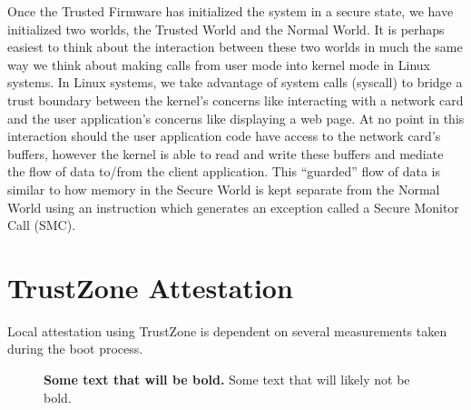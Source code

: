 Once the Trusted Firmware has initialized the system in a secure state, we have initialized two worlds, the Trusted World and the Normal World. It is perhaps easiest to think about the interaction between these two worlds in much the same way we think about making calls from user mode into kernel mode in Linux systems. In Linux systems, we take advantage of system calls (syscall) to bridge a trust boundary between the kernel's concerns like interacting with a network card and the user application's concerns like displaying a web page. At no point in this interaction should the user application code have access to the network card's buffers, however the kernel is able to read and write these buffers and mediate the flow of data to/from the client application. This ``guarded'' flow of data is similar to how memory in the Secure World is kept separate from the Normal World using an instruction which generates an exception called a Secure Monitor Call (SMC).

\section{TrustZone Attestation}

Local \gls{attestation} using TrustZone is dependent on several \glspl{measurement} taken during the boot process.

\begin{figure}[ht]
\centering

\caption[TruzeZone Attestation]{\textbf{Some text that will be bold.} Some text that will likely not be bold.}
\label{fig:tz-measure}
\end{figure}